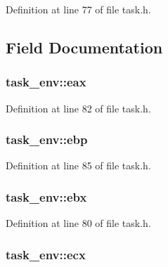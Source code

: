 Definition at line 77 of file task.\+h.



\subsection{Field Documentation}
\hypertarget{structtask__env_a617049724b4b79278b4fe107d9df7e3e}{
\subsubsection[{eax}]{ task\+\_\+env\+::eax}}\label{structtask__env_a617049724b4b79278b4fe107d9df7e3e}


Definition at line 82 of file task.\+h.

\hypertarget{structtask__env_a6630718bd69f6876f2ff74299316ae47}{
\subsubsection[{ebp}]{ task\+\_\+env\+::ebp}}\label{structtask__env_a6630718bd69f6876f2ff74299316ae47}


Definition at line 85 of file task.\+h.

\hypertarget{structtask__env_a8594000ef53ff5bb74343e54648fd5e1}{
\subsubsection[{ebx}]{ task\+\_\+env\+::ebx}}\label{structtask__env_a8594000ef53ff5bb74343e54648fd5e1}


Definition at line 80 of file task.\+h.

\hypertarget{structtask__env_a069a27e98e74717519066b7e73e9bc0e}{
\subsubsection[{ecx}]{ task\+\_\+env\+::ecx}}\label{structtask__env_a069a27e98e74717519066b7e73e9bc0e}


